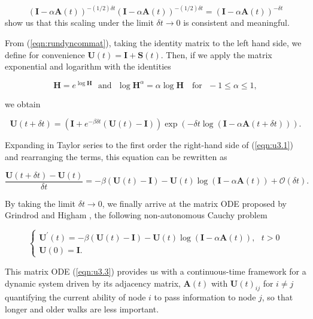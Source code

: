 $$(\mathbf{I} - \alpha\mathbf{A}(t))^{-(1/2)\delta t} (\mathbf{I} - \alpha\mathbf{A}(t))^{-(1/2)\delta t} = (\mathbf{I} - \alpha\mathbf{A}(t))^{-\delta t}$$ show us that this scaling under the limit $\delta t \to 0$ is consistent and meaningful.

From (\ref{eqn:rundyncommat}), taking the identity matrix to the left hand side, we define for convenience $\mathbf{U}(t)=\mathbf{I} + \mathbf{S}(t)$. Then, if we apply the matrix exponential and logarithm with the identities \cite{higham2008functions}

$$\mathbf{H} =e^{\log \mathbf{H}} \text{~~and~~} \log \mathbf{H}^\alpha =\alpha\log \mathbf{H} \text{~~~for~~} -1 \le \alpha \le 1,$$ 

we obtain 

\begin{equation}
\label{eqn:u3.1}
    \mathbf{U}(t + \delta t) = (\mathbf{I} + e^{-\beta\delta t}(\mathbf{U}(t) - \mathbf{I})) \exp\left(-\delta t \log (\mathbf{I} - \alpha \mathbf{A}(t + \delta t)) \right).
\end{equation} 

Expanding in Taylor series to the first order the right-hand
side of (\ref{eqn:u3.1}) and rearranging the terms, this equation can be rewritten as

\begin{equation*}
\label{eqn:u3.1b}
    \frac{\mathbf{U}(t + \delta t) - \mathbf{U}(t)}{\delta t} = -\beta (\mathbf{U}(t) - \mathbf{I}) - \mathbf{U}(t)\log (\mathbf{I} - \alpha \mathbf{A}(t)) + \mathcal{O}(\delta t).
\end{equation*}

By taking the limit $\delta t \to 0$, we finally arrive at the matrix ODE proposed by Grindrod and Higham \cite{grindrod2014dynamical}, the following non-autonomous Cauchy problem

\begin{equation}
\label{eqn:u3.3}
    \begin{cases}
      \mathbf{U^{\prime}}(t) = -\beta (\mathbf{U}(t) - \mathbf{I}) - \mathbf{U}(t)\log (\mathbf{I} - \alpha \mathbf{A}(t)), ~~~t>0\\
      \mathbf{U}(0)=\mathbf{I}.
    \end{cases}
\end{equation}

This matrix ODE (\ref{eqn:u3.3}) provides us with a continuous-time framework for a dynamic system driven by its adjacency matrix, $\mathbf{A}(t)$ with $\mathbf{U}(t)_{ij}$ for $i\ne j$ quantifying the current ability of node $i$ to pass information to node $j$, so that longer and older walks are less important.

